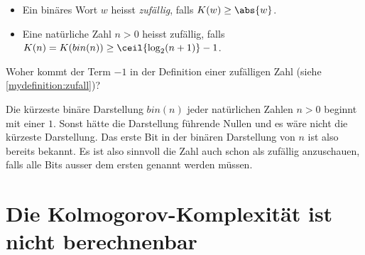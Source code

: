 \begin{mydefinition}\label{mydefinition:zufall}
\leavevmode
\begin{itemize}
	\item Ein binäres Wort $w$ heisst \textit{zufällig}, falls $K(w)\geq\abs{w}$.
	\item Eine natürliche Zahl $n>0$ heisst zufällig, falls $K(n) = K(bin(n)) \geq \ceil{\log_2(n+1)} - 1$.
\end{itemize}
\end{mydefinition}

\begin{myexercise}
	\leavevmode
	Woher kommt der Term $-1$ in der Definition einer zufälligen Zahl (siehe \cref{mydefinition:zufall})?
	\begin{myanswer}
		Die kürzeste binäre Darstellung $bin(n)$ jeder natürlichen Zahlen $n>0$ beginnt mit einer $1$. Sonst hätte die Darstellung führende Nullen und es wäre nicht die kürzeste Darstellung. Das erste Bit in der binären Darstellung von $n$ ist also bereits bekannt. Es ist also sinnvoll die Zahl auch schon als zufällig anzuschauen, falls alle Bits ausser dem ersten genannt werden müssen.
	\end{myanswer}
\end{myexercise}

\clearpage
\section{Die Kolmogorov-Komplexität ist nicht berechnenbar}

